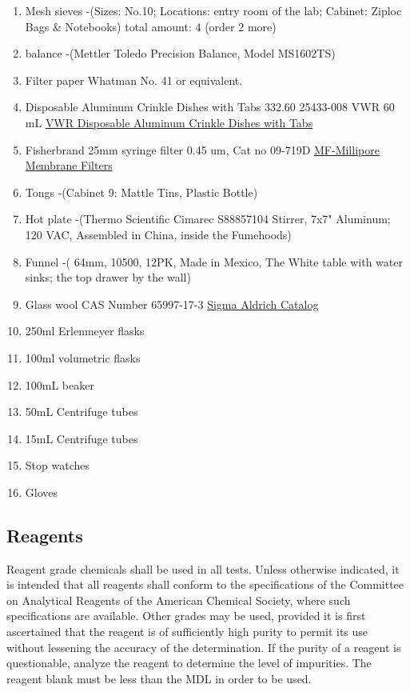 \documentclass[12pt]{../SOP3_alpha}
\begin{document}
\begin{enumerate}
  \item Mesh sieves -(Sizes: No.10; Locations: entry room of the lab; Cabinet: Ziploc Bags \& Notebooks) total amount: 4 (order 2 more) 
  \item balance -(Mettler Toledo Precision Balance, Model MS1602TS)
  \item Filter paper Whatman No. 41 or equivalent. 
  \item Disposable Aluminum Crinkle Dishes with Tabs 332.60 25433-008 VWR 60 mL          \href{https://us.vwr.com/store/catalog/product.jsp?product_id=4622693}{VWR Disposable Aluminum Crinkle Dishes with Tabs}
  \item Fisherbrand 25mm syringe filter 0.45 um, Cat no 09-719D \href{https://www.emdmillipore.com/US/en/product/MF-Millipore%E2%84%A2-Membrane-Filters,MM_NF-C152}{MF-Millipore Membrane Filters}
  \item Tongs -(Cabinet 9: Mattle Tins, Plastic Bottle)
  \item Hot plate -(Thermo Scientific Cimarec S88857104 Stirrer, 7x7" Aluminum; 120 VAC, Assembled in China, inside the Fumehoods)
  \item Funnel -( 64mm, 10500, 12PK, Made in Mexico, The White table with water sinks; the top drawer by the wall)
  \item Glass wool CAS Number 65997-17-3 \href{http://www.sigmaaldrich.com/catalog/product/sial/18421?lang=en&region=US}{Sigma Aldrich Catalog}
  \item 250ml Erlenmeyer flasks
  \item 100ml volumetric flasks
  \item 100mL beaker
  \item 50mL Centrifuge tubes
  \item 15mL Centrifuge tubes
  \item Stop watches 
  \item Gloves
\end{enumerate}

\subsection{Reagents}

\NP Reagent grade chemicals shall be used in all tests. Unless otherwise indicated, it is
intended that all reagents shall conform to the specifications of the Committee on Analytical Reagents of the American Chemical Society, where such specifications are available. Other grades may be used, provided it is first ascertained that the reagent is of sufficiently high purity to permit its use without lessening the accuracy of the determination. If the purity of a reagent is questionable, analyze the reagent to determine the level of impurities. The reagent blank must be less than the MDL in order to be used. 
\end{document}
